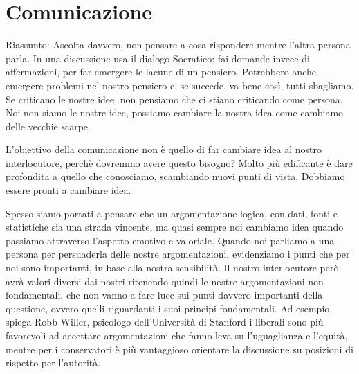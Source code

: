 \documentclass[12pt]{book} %
\begin{document}
\clearpage\section{Comunicazione}

\begin{mdframed}[linewidth=1pt]
Riassunto: Ascolta davvero, non pensare a cosa rispondere mentre l'altra persona parla. In una discussione usa il dialogo Socratico: fai domande invece di affermazioni, per far emergere le lacune di un pensiero. Potrebbero anche emergere problemi nel nostro pensiero e, se succede, va bene così, tutti sbagliamo. Se criticano le nostre idee, non pensiamo che ci stiano criticando come persona. Noi non siamo le nostre idee, possiamo cambiare la nostra idea come cambiamo delle vecchie scarpe.
\end{mdframed}

L'obiettivo della comunicazione non è quello di far cambiare idea al nostro interlocutore, perchè dovremmo avere questo bisogno?
Molto più edificante è dare profondita a quello che conosciamo, scambiando nuovi punti di vista. Dobbiamo essere pronti a cambiare idea.

Spesso siamo portati a pensare che un argomentazione logica, con dati, fonti e statistiche sia una strada vincente, ma
quasi sempre noi cambiamo idea quando passiamo attraverso l'aspetto emotivo e valoriale. Quando
noi parliamo a una persona per persuaderla delle nostre argomentazioni, evidenziamo i punti che per noi sono
importanti, in base alla nostra sensibilità. Il nostro interlocutore però avrà valori diversi dai nostri ritenendo
quindi le nostre argomentazioni non fondamentali, che non vanno a fare luce sui punti davvero importanti della
questione, ovvero quelli riguardanti i suoi principi fondamentali.
Ad esempio, spiega Robb Willer, psicologo dell'Università di Stanford i liberali sono più favorevoli ad accettare argomentazioni
che fanno leva su l'uguaglianza e l'equità, mentre per i conservatori è più vantaggioso orientare la discussione su
posizioni di rispetto per l'autorità.
\end{document}

